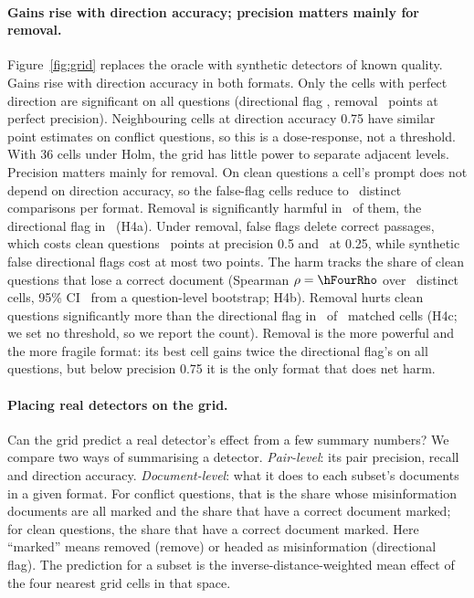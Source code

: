 \paragraph{Gains rise with direction accuracy; precision matters mainly for removal.}
Figure~\ref{fig:grid} replaces the oracle with synthetic detectors of known quality. Gains rise with direction
accuracy in both formats. Only the cells with perfect direction are significant on all questions (directional flag
\gDirOneDOneAll, removal \gRemOneDOneAll\ points at perfect precision). Neighbouring cells at direction accuracy
0.75 have similar point estimates on conflict questions, so this is a dose-response, not a threshold. With 36 cells
under Holm, the grid has little power to separate adjacent levels. Precision matters mainly for removal. On clean questions a cell's prompt does not depend
on direction accuracy, so the false-flag cells reduce to \hFourRemN\ distinct comparisons per format. Removal is
significantly harmful in \hFourRemHarm\ of them, the directional flag in \hFourDirHarm\ (H4a). Under removal, false flags
delete correct passages, which costs clean questions \agRemHalfDOneClean\ points at precision 0.5 and
\agRemQuDOneClean\ at 0.25, while synthetic false directional flags cost at most two points. The harm tracks the
share of clean questions that lose a correct document (Spearman $\rho=\hFourRho$ over \hFourRhoCells\ distinct
cells, 95\% CI \hFourRhoCI\ from a question-level bootstrap; H4b). Removal hurts clean questions significantly more
than the directional flag in \hFourRemWorse\ of \hFourMatched\ matched cells (H4c; we set no threshold, so we report
the count). Removal is the more powerful and the more fragile format: its best cell gains twice the directional
flag's on all questions, but below precision 0.75 it is the only format that does net harm.


\paragraph{Placing real detectors on the grid.}
\label{sec:placement}
Can the grid predict a real detector's effect from a few summary numbers? We compare two ways of summarising a
detector. \emph{Pair-level}: its pair precision, recall and direction accuracy. \emph{Document-level}: what it does
to each subset's documents in a given format. For conflict questions, that is the share whose misinformation documents
are all marked and the share that have a correct document marked; for clean questions, the share that have a correct
document marked. Here ``marked'' means removed (remove) or headed as misinformation (directional flag). The prediction
for a subset is the inverse-distance-weighted mean effect of the four nearest grid cells in that space.

